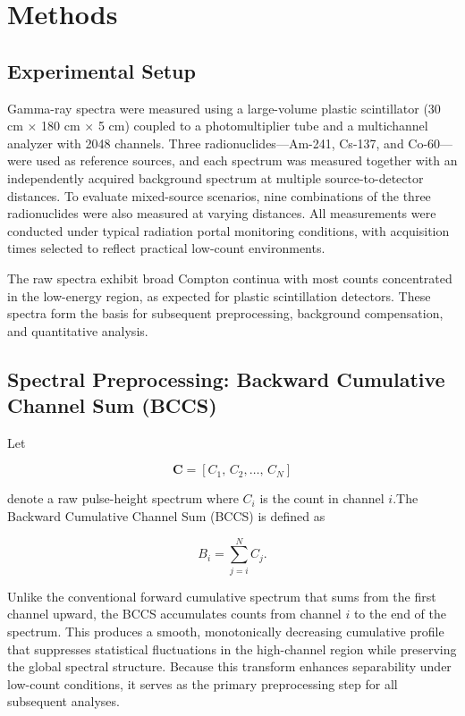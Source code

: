 \documentclass[10pt]{wlscirep}
\begin{document}
\section*{Methods}
\subsection*{Experimental Setup}
Gamma-ray spectra were measured using a large-volume plastic scintillator (30 cm $\times$ 180 cm $\times$ 5 cm) coupled to a photomultiplier tube and a multichannel analyzer with 2048 channels. Three radionuclides—Am-241, Cs-137, and Co-60—were used as reference sources, and each spectrum was measured together with an independently acquired background spectrum at multiple source-to-detector distances. To evaluate mixed-source scenarios, nine combinations of the three radionuclides were also measured at varying distances. All measurements were conducted under typical radiation portal monitoring conditions, with acquisition times selected to reflect practical low-count environments.

The raw spectra exhibit broad Compton continua with most counts concentrated in the low-energy region, as expected for plastic scintillation detectors. These spectra form the basis for subsequent preprocessing, background compensation, and quantitative analysis.

\subsection*{Spectral Preprocessing: Backward Cumulative Channel Sum (BCCS)}

Let

$$
\mathbf{C} = [C_1,\,C_2,\ldots,\,C_N]
$$

denote a raw pulse-height spectrum where $C_i$ is the count in channel $i$.The Backward Cumulative Channel Sum (BCCS) is defined as

\begin{equation}
B_i = \sum_{j=i}^N C_j. \label{eq:BCCS}
\end{equation}

Unlike the conventional forward cumulative spectrum that sums from the first channel upward, the BCCS accumulates counts from channel 
$i$ to the end of the spectrum. This produces a smooth, monotonically decreasing cumulative profile that suppresses statistical fluctuations in the high-channel region while preserving the global spectral structure. Because this transform enhances separability under low-count conditions, it serves as the primary preprocessing step for all subsequent analyses.
\end{document}
